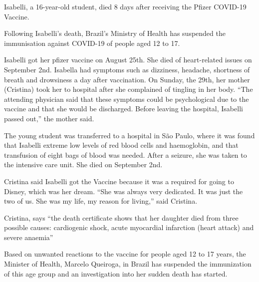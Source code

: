 Isabelli, a 16-year-old student, died 8 days after receiving the Pfizer COVID-19
Vaccine.

Following Isabelli’s death, Brazil’s Ministry of Health has suspended the
immunisation against COVID-19 of people aged 12 to 17.

Isabelli got her pfizer vaccine on August 25th. She died of heart-related issues
on September 2nd.  Isabella had symptoms such as dizziness, headache, shortness
of breath and drowsiness a day after vaccination. On Sunday, the 29th, her
mother (Cristina) took her to hospital after she complained of tingling in her
body. “The attending physician said that these symptoms could be psychological
due to the vaccine and that she would be discharged. Before leaving the
hospital, Isabelli passed out,” the mother said.

The young student was transferred to a hospital in São Paulo, where it was found
that Isabelli extreme low levels of red blood cells and haemoglobin, and that
transfusion of eight bags of blood was needed. After a seizure, she was taken to
the intensive care unit. She died on September 2nd.

Cristina said Isabelli got the Vaccine because it was a required for going to
Disney, which was her dream. “She was always very dedicated. It was just the two
of us. She was my life, my reason for living,” said Cristina.

Cristina, says “the death certificate shows that her daughter died from three
possible causes: cardiogenic shock, acute myocardial infarction (heart attack)
and severe anaemia”

Based on unwanted reactions to the vaccine for people aged 12 to 17 years, the
Minister of Health, Marcelo Queiroga, in Brazil has suspended the immunization
of this age group and an investigation into her sudden death has started.

